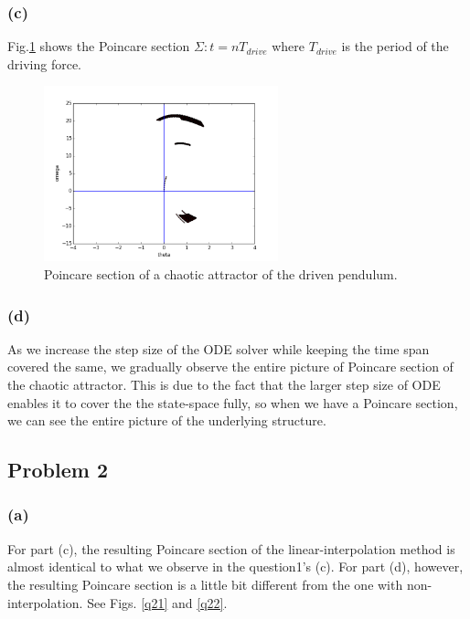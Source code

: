 \documentclass{article}
\begin{document}
\subsubsection*{(c)}
Fig.\ref{q1c} shows the Poincare section $\Sigma:t = nT_{drive}$ where $T_{drive}$ is the period of the driving force. 

\begin{figure}[h]
  \centering
  \includegraphics[height=2in]{figs/q1/q1c_delta_t_0005.png}
  \caption{Poincare section of a chaotic attractor of the driven pendulum.}
  \label{q1c}
\end{figure}

\subsubsection*{(d)}
As we increase the step size of the ODE solver while keeping the time span covered the same, we gradually observe the entire picture of Poincare section of the chaotic attractor. This is due to the fact that the larger step size of ODE enables it to cover the the state-space fully, so when we have a Poincare section, we can see the entire picture of the underlying structure. 

\subsection*{Problem 2}
\subsubsection*{(a)}
For part (c), the resulting Poincare section of the linear-interpolation method is almost identical to what we observe in the question1's (c). For part (d), however, the resulting Poincare section is a little bit different from the one with non-interpolation. See Figs. \ref{q21} and \ref{q22}.
\end{document}

